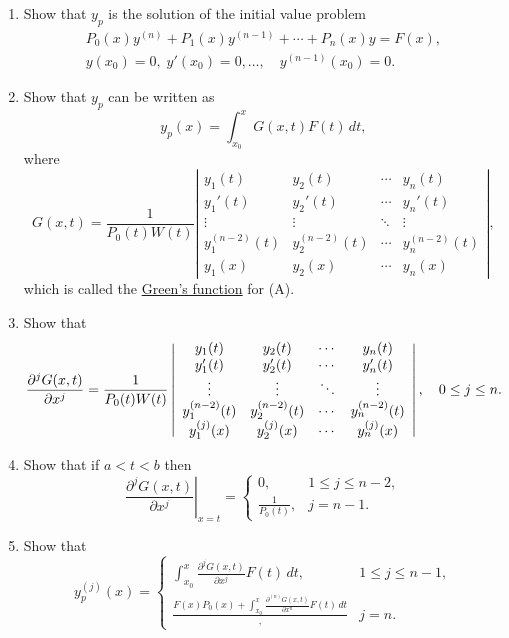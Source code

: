 \documentclass{ximera}
\begin{document}
\begin{problem}
\begin{enumerate}
\item %
Show that  $y_p$  is the
solution of the initial value problem
$$
\begin{array}{r}
P_0(x)y^{(n)}+P_1(x)y^{(n-1)}+\cdots+P_n(x)y=F(x),\\y(x_0)=0,\;
y'(x_0)=0,\dots,\quad y^{(n-1)}(x_0)=0.
\end{array}
$$
\item %
Show that  $y_p$  can be written as
$$
y_p(x)=\int_{x_0}^x G(x,t)F(t)\,dt,
$$
where
$$
G(x,t)=\frac{1}{P_0(t)W(t)}\left|\begin{array}{cccc}
y_1(t)&y_2(t)&\cdots&y_n(t)\\ 
y_1'(t)&y_2'(t)&\cdots&y_n'(t)\\ 
\vdots&\vdots&\ddots&\vdots\\ 
y_1^{(n-2)}(t)&y_2^{(n-2)}(t)&\cdots&y_n^{(n-2)}(t)\\ 
y_1(x)&y_2(x)&\cdots&y_n(x)\end{array}\right|,
$$
which is called  the
\href{http://www-history.mcs.st-and.ac.uk/Mathematicians/Green.html}
{Green's function} for (A).
\item %
Show that
$$
{\partial^{j}G(x,t)\over\partial x^j}
=\frac{1}{P_0(t)W(t)}\left|\begin{array}{cccc}
y_1(t)&y_2(t)&\cdots&y_n(t)\\ 
y_1'(t)&y_2'(t)&\cdots&y_n'(t)\\ 
\vdots&\vdots&\ddots&\vdots\\ 
y_1^{(n-2)}(t)&y_2^{(n-2)}(t)&\cdots&y_n^{(n-2)}(t)\\ 
y_1^{(j)}(x)&y_2^{(j)}(x)&\cdots&y_n^{(j)}(x)\end{array}\right|,\quad 0\le j\le
n.
$$
\item %
Show that if $a<t<b$ then
$$
\left.\frac{\partial^{j}G(x,t)}{\partial x^j}\right|_{x=t}=
\left\{\begin{array}{cl} 0,&1\le j\le n-2,\\ 
\frac{1}{P_0(t)},&j=n-1.
\end{array}\right.
$$
\item %
Show that
$$
 y_p^{(j)}(x)=\left\{\begin{array}{cl}\int_{x_0}^x
\frac{\partial^{j}G(x,t)}{\partial x^j}F(t)\,dt,&1\le j\le n-1,\\
\frac{{F(x)}{P_0(x)}+
\int_{x_0}^x\frac{\partial^{(n)}G(x,t)}{\partial x^n}F(t)\,dt},&j=n.
\end{array}\right.
$$
\end{enumerate}
\end{problem}
\end{document}
